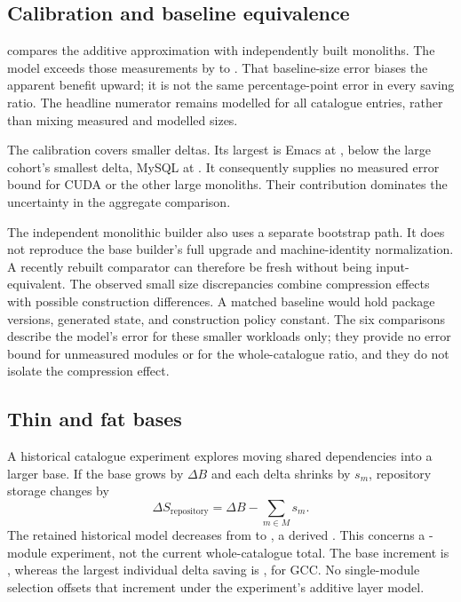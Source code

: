 \subsection{Calibration and baseline equivalence}

 compares the additive approximation with independently built monoliths. The model exceeds those measurements by  to . That baseline-size error biases the apparent benefit upward; it is not the same percentage-point error in every saving ratio. The headline numerator remains modelled for all catalogue entries, rather than mixing measured and modelled sizes.



The calibration covers smaller deltas. Its largest is Emacs at , below the large cohort's smallest delta, MySQL at . It consequently supplies no measured error bound for CUDA or the other large monoliths. Their contribution dominates the uncertainty in the aggregate comparison.

The independent monolithic builder also uses a separate bootstrap path. It does not reproduce the base builder's full upgrade and machine-identity normalization. A recently rebuilt comparator can therefore be fresh without being input-equivalent. The observed small size discrepancies combine compression effects with possible construction differences. A matched baseline would hold package versions, generated state, and construction policy constant. The six comparisons describe the model's error for these smaller workloads only; they provide no error bound for unmeasured modules or for the whole-catalogue ratio, and they do not isolate the compression effect.

\subsection{Thin and fat bases}

A historical catalogue experiment explores moving shared dependencies into a larger base. If the base grows by $\Delta B$ and each delta shrinks by $s_m$, repository storage changes by
\begin{equation}
\Delta S_{\mathrm{repository}}=\Delta B-\sum_{m\in M}s_m.
\end{equation}
The retained historical model decreases from  to , a derived . This concerns a -module experiment, not the current whole-catalogue total. The base increment is , whereas the largest individual delta saving is , for \ac{GCC}. No single-module selection offsets that increment under the experiment's additive layer model.

